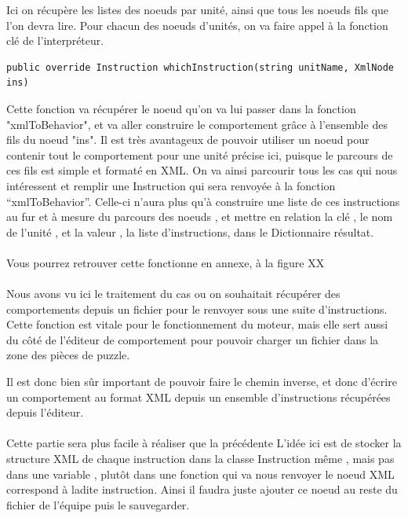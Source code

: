 \documentclass{report}
\begin{document}
Ici on récupère les listes des noeuds par unité, ainsi que tous les noeuds fils que l’on devra lire.
Pour chacun des noeuds d'unités, on va faire appel à la fonction clé de l'interpréteur.

\begin{lstlisting}[frame=single]
public override Instruction whichInstruction(string unitName, XmlNode ins)
\end{lstlisting}

Cette fonction va récupérer le noeud qu'on va lui passer dans la fonction "xmlToBehavior", et va aller construire le comportement grâce à l'ensemble des fils du noeud "ins".
Il est très avantageux de pouvoir utiliser un noeud pour contenir tout le comportement pour une unité précise ici, puisque le parcours de ces fils est simple et formaté en XML. 
On va ainsi parcourir tous les cas qui nous intéressent  et remplir une Instruction qui sera renvoyée à la fonction “xmlToBehavior”.
Celle-ci n’aura plus qu'à construire une liste de ces instructions au fur et à mesure du parcours des noeuds , et mettre en relation la clé , le nom de l’unité , et la valeur , la liste d’instructions, dans le Dictionnaire résultat.
\paragraph{}
Vous pourrez retrouver cette fonctionne en annexe, à la figure XX
\paragraph{}
Nous avons vu ici le traitement du cas ou on souhaitait récupérer des comportements depuis un fichier pour le renvoyer sous une suite d’instructions. Cette fonction est vitale pour le fonctionnement du moteur, mais elle sert aussi du côté de l’éditeur de comportement pour pouvoir charger un fichier dans la zone des pièces de puzzle.

Il est donc bien sûr important de pouvoir faire le chemin inverse, et donc d’écrire un comportement au format XML depuis un ensemble d’instructions récupérées depuis l’éditeur.

\paragraph{}

Cette partie sera plus facile à réaliser que la précédente 
L’idée ici est de stocker la structure XML de chaque instruction dans la classe Instruction même , mais pas dans une variable , plutôt dans une fonction qui va nous renvoyer le noeud XML correspond à ladite instruction. Ainsi il faudra juste ajouter ce noeud au reste du fichier de l’équipe puis le sauvegarder.
\end{document}
